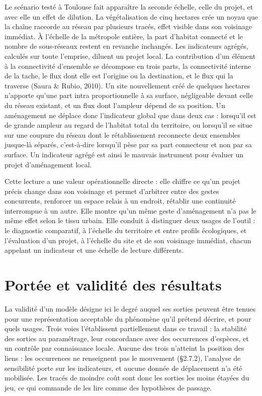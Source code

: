 \documentclass[a4paper,12pt]{report}
\begin{document}
Le scénario testé à Toulouse fait apparaître la seconde échelle, celle du projet, et avec elle un effet de dilution. La végétalisation de cinq hectares crée un noyau que la chaîne raccorde au réseau par plusieurs tracés, effet visible dans son voisinage immédiat. À l'échelle de la métropole entière, la part d'habitat connecté et le nombre de sous-réseaux restent en revanche inchangés. Les indicateurs agrégés, calculés sur toute l'emprise, diluent un projet local. La contribution d'un élément à la connectivité d'ensemble se décompose en trois parts, la connectivité interne de la tache, le flux dont elle est l'origine ou la destination, et le flux qui la traverse (Saura \& Rubio, 2010). Un site nouvellement créé de quelques hectares n'apporte qu'une part intra proportionnelle à sa surface, négligeable devant celle du réseau existant, et un flux dont l'ampleur dépend de sa position. Un aménagement ne déplace donc l'indicateur global que dans deux cas : lorsqu'il est de grande ampleur au regard de l'habitat total du territoire, ou lorsqu'il se situe sur une coupure du réseau dont le rétablissement reconnecte deux ensembles jusque-là séparés, c'est-à-dire lorsqu'il pèse par sa part connecteur et non par sa surface. Un indicateur agrégé est ainsi le mauvais instrument pour évaluer un projet d'aménagement local.

Cette lecture a une valeur opérationnelle directe : elle chiffre ce qu'un projet précis change dans son voisinage et permet d'arbitrer entre des gestes concurrents, renforcer un espace relais à un endroit, rétablir une continuité interrompue à un autre. Elle montre qu'un même geste d'aménagement n'a pas le même effet selon le tissu urbain. Elle conduit à distinguer deux usages de l'outil : le diagnostic comparatif, à l'échelle du territoire et entre profils écologiques, et l'évaluation d'un projet, à l'échelle du site et de son voisinage immédiat, chacun appelant un indicateur et une échelle de lecture différents.

\section{Portée et validité des résultats}
La validité d'un modèle désigne ici le degré auquel ses sorties peuvent être tenues pour une représentation acceptable du phénomène qu'il prétend décrire, et pour quels usages. Trois voies l'établissent partiellement dans ce travail : la stabilité des sorties au paramétrage, leur concordance avec des occurrences d'espèces, et un contrôle par connaissance locale. Aucune des trois n'atteint la position des liens : les occurrences ne renseignent pas le mouvement (§2.7.2), l'analyse de sensibilité porte sur les indicateurs, et aucune donnée de déplacement n'a été mobilisée. Les tracés de moindre coût sont donc les sorties les moins étayées du jeu, ce qui commande de les lire comme des hypothèses de passage.
\end{document}
